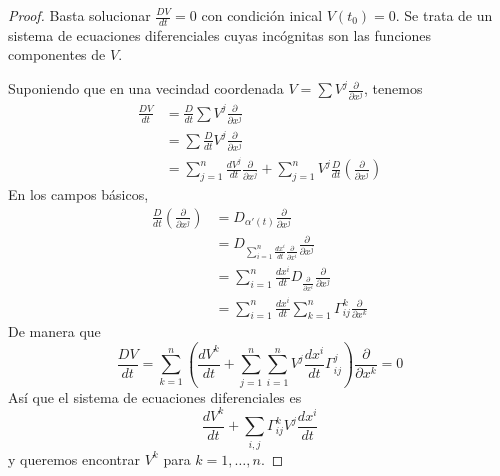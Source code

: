 \documentclass[spanish]{book}
\theoremstyle{definition}
\begin{document}
	\begin{proof}
		Basta solucionar $\frac{DV}{dt}=0$ con condición inical $V(t_0)=0$. Se trata de un sistema de ecuaciones diferenciales cuyas incógnitas son las funciones componentes de $V$.
		
		Suponiendo que en una vecindad coordenada $V=\sum V^j\frac{\partial}{\partial x^j}$, tenemos
		\begin{align*}
			\frac{DV}{dt}&=\frac{D}{dt}\sum V^j\frac{\partial}{\partial x^j}\\
			&=\sum\frac{D}{dt}V^j\frac{\partial}{\partial x^j}\\
			&=\sum_{j=1}^n\frac{dV^j}{dt}\frac{\partial}{\partial x^j}+\sum_{j=1}^nV^j\frac{D}{dt}\left(\frac{\partial}{\partial x^j}\right)
		\end{align*}
		En los campos básicos,
		\begin{align*}
			\frac{D}{dt}\left(\frac{\partial}{\partial x^j}\right)&=D_{\alpha'(t)}\frac{\partial}{\partial x^j}\\
			&=D_{\sum_{i=1}^n\frac{dx^i}{dt}\frac{\partial}{\partial x^i}}\frac{\partial}{\partial x^j}\\
			&=\sum_{i=1}^n\frac{dx^i}{dt}D_{\frac{\partial}{\partial x^i}}\frac{\partial}{\partial x^j}\\
			&=\sum_{i=1}^n\frac{dx^i}{dt}\sum_{k=1}^n\Gamma_{ij}^k\frac{\partial}{\partial x^k}
		\end{align*}
		De manera que
		\[\frac{DV}{dt}=\sum_{k=1}^n\left(\frac{dV^k}{dt}+\sum_{j=1}^n\sum_{i=1}^nV^j\frac{dx^i}{dt}\Gamma_{ij}^j\right)\frac{\partial}{\partial x^k}=0\]
		Así que el sistema de ecuaciones diferenciales es
		\[\frac{dV^k}{dt}+\sum_{i,j}\Gamma^k_{ij}V^j\frac{dx^i}{dt}\]
		y queremos encontrar $V^k$ para $k=1,\ldots,n$.
	\end{proof}
	
\end{document}
